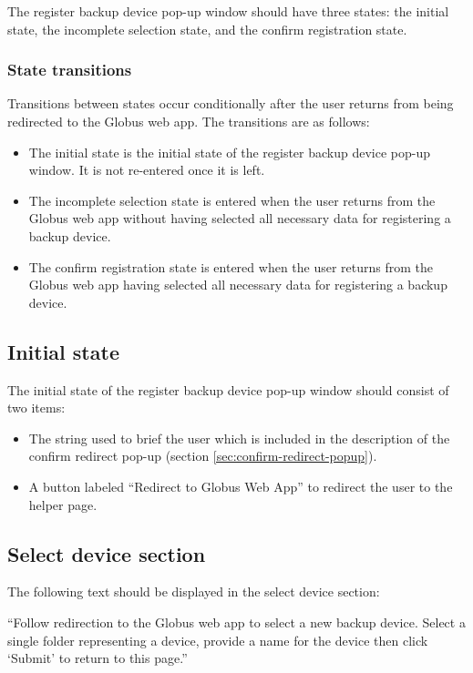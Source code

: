 The register backup device pop-up window should have three states: the initial state,
the incomplete selection state, and the confirm registration state. 

\subsubsection{State transitions}

Transitions between states occur conditionally after the user returns from being redirected 
to the Globus web app. The transitions are as follows:

\begin{itemize}
    \item The initial state is the initial state of the register backup device pop-up window. It
    is not re-entered once it is left.
    \item The incomplete selection state is entered when the user returns from the Globus web app
    without having selected all necessary data for registering a backup device.
    \item The confirm registration state is entered when the user returns from the Globus web app
    having selected all necessary data for registering a backup device.
\end{itemize}

\subsection{Initial state}

The initial state of the register backup device pop-up window should consist of two items:
\begin{itemize}
    \item The string used to brief the user which is included in the description of the confirm 
    redirect pop-up (section \ref{sec:confirm-redirect-popup}).
    \item A button labeled ``Redirect to Globus Web App'' to redirect the user to the helper page.
\end{itemize}

\subsection{Select device section}

The following text should be displayed in the select device section:

\vspace{3mm}
``Follow redirection to the Globus web app to select a new backup device. Select a single
folder representing a device, provide a name for the device then click `Submit' to return 
to this page.''
\vspace{3mm}

